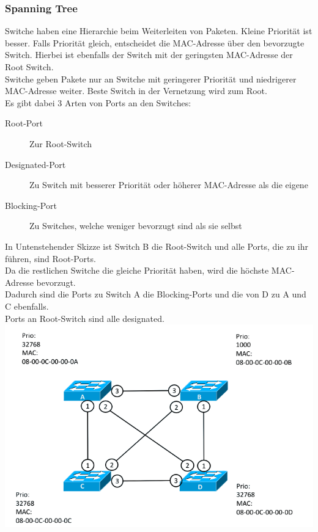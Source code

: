 \documentclass[12pt,a4paper]{article}
\begin{document}
			\subsubsection{Spanning Tree}
				Switche haben eine Hierarchie beim Weiterleiten von Paketen. Kleine Priorität ist besser. Falls Priorität gleich, entscheidet die MAC-Adresse über den bevorzugte Switch. Hierbei ist ebenfalls der Switch mit der geringsten MAC-Adresse der Root Switch.\\
				Switche geben Pakete nur an Switche mit geringerer Priorität und niedrigerer MAC-Adresse weiter. Beste Switch in der Vernetzung wird zum Root.\\
				Es gibt dabei 3 Arten von Ports an den Switches:
				\begin{description}
					\item[Root-Port] Zur Root-Switch
					\item[Designated-Port] Zu Switch mit besserer Priorität oder höherer MAC-Adresse als die eigene
					\item[Blocking-Port] Zu Switches, welche weniger bevorzugt sind als sie selbst 
				\end{description}
				In Untenstehender Skizze ist Switch B die Root-Switch und alle Ports, die zu ihr führen, sind Root-Ports.\\
				Da die restlichen Switche die gleiche Priorität haben, wird die höchste MAC-Adresse bevorzugt. \\
				Dadurch sind die Ports zu Switch A die Blocking-Ports und die von D zu A und C ebenfalls. \\
				Ports an Root-Switch sind alle designated.\\
				\includegraphics[width=\textwidth]{Bilder/RouterVermascht.png}
\end{document}
